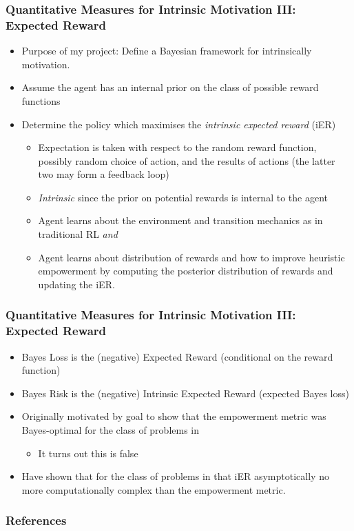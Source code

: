 \documentclass[aspectratio=169]{beamer}
\begin{document}
\begin{frame}
	\frametitle{Quantitative Measures for Intrinsic Motivation III: Expected Reward}
	\begin{itemize}
		\item Purpose of my project: Define a Bayesian framework for intrinsically motivation.
		\item Assume the agent has an internal prior on the class of possible reward functions\pause
		\item Determine the policy which maximises the \textit{intrinsic expected reward} (iER)
		\begin{itemize}
			\item Expectation is taken with respect to the random reward function, possibly random choice of action, and the results of actions (the latter two may form a feedback loop)\pause
			\item \textit{Intrinsic} since the prior on potential rewards is internal to the agent\pause\vspace{0.5em}
			\item Agent learns about the environment and transition mechanics as in traditional RL \textit{and} 
			\item Agent learns about distribution of rewards and how to improve heuristic empowerment by computing the posterior distribution of rewards and updating the iER.\pause			
		\end{itemize}
	\end{itemize}
\end{frame}

\begin{frame}
	\frametitle{Quantitative Measures for Intrinsic Motivation III: Expected Reward}
	\begin{itemize}	 
		\item Bayes Loss is the (negative) Expected Reward (conditional on the reward function)
		\item Bayes Risk is the (negative) Intrinsic Expected Reward (expected Bayes loss) \vspace{1em}\pause
		\item Originally motivated by goal to show that the empowerment metric was Bayes-optimal for the class of problems in \citet{mohamed2015variational}
		\begin{itemize}
			\item It turns out this is false
		\end{itemize}
		\item Have shown that for the class of problems in \citet{mohamed2015variational} that iER asymptotically no more computationally complex than the empowerment metric.
	\end{itemize}
	
\end{frame}

\begin{frame}[allowframebreaks]
\frametitle{References}
\nocite{*}

\end{frame}
\end{document}
